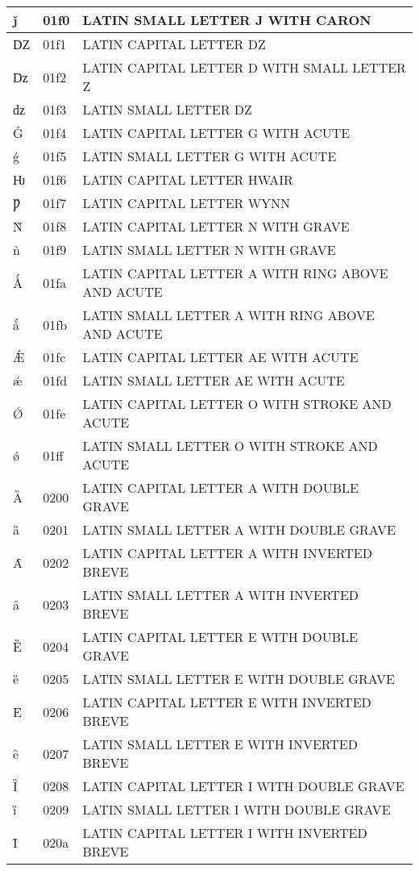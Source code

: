 \documentclass[12pt,letterpaper,openany]{book}
\begin{document}
\begin{center}
\begin{supertabular}{|m{0.25in}|m{0.5in}|m{4in}|}
			ǰ & 01f0 & LATIN SMALL LETTER J WITH CARON\\\hline
			Ǳ & 01f1 & LATIN CAPITAL LETTER DZ\\\hline
			ǲ & 01f2 & LATIN CAPITAL LETTER D WITH SMALL LETTER Z\\\hline
			ǳ & 01f3 & LATIN SMALL LETTER DZ\\\hline
			Ǵ & 01f4 & LATIN CAPITAL LETTER G WITH ACUTE\\\hline
			ǵ & 01f5 & LATIN SMALL LETTER G WITH ACUTE\\\hline
			Ƕ & 01f6 & LATIN CAPITAL LETTER HWAIR\\\hline
			Ƿ & 01f7 & LATIN CAPITAL LETTER WYNN\\\hline
			Ǹ & 01f8 & LATIN CAPITAL LETTER N WITH GRAVE\\\hline
			ǹ & 01f9 & LATIN SMALL LETTER N WITH GRAVE\\\hline
			Ǻ & 01fa & LATIN CAPITAL LETTER A WITH RING ABOVE AND ACUTE\\\hline
			ǻ & 01fb & LATIN SMALL LETTER A WITH RING ABOVE AND ACUTE\\\hline
			Ǽ & 01fc & LATIN CAPITAL LETTER AE WITH ACUTE\\\hline
			ǽ & 01fd & LATIN SMALL LETTER AE WITH ACUTE\\\hline
			Ǿ & 01fe & LATIN CAPITAL LETTER O WITH STROKE AND ACUTE\\\hline
			ǿ & 01ff & LATIN SMALL LETTER O WITH STROKE AND ACUTE\\\hline
			Ȁ & 0200 & LATIN CAPITAL LETTER A WITH DOUBLE GRAVE\\\hline
			ȁ & 0201 & LATIN SMALL LETTER A WITH DOUBLE GRAVE\\\hline
			Ȃ & 0202 & LATIN CAPITAL LETTER A WITH INVERTED BREVE\\\hline
			ȃ & 0203 & LATIN SMALL LETTER A WITH INVERTED BREVE\\\hline
			Ȅ & 0204 & LATIN CAPITAL LETTER E WITH DOUBLE GRAVE\\\hline
			ȅ & 0205 & LATIN SMALL LETTER E WITH DOUBLE GRAVE\\\hline
			Ȇ & 0206 & LATIN CAPITAL LETTER E WITH INVERTED BREVE\\\hline
			ȇ & 0207 & LATIN SMALL LETTER E WITH INVERTED BREVE\\\hline
			Ȉ & 0208 & LATIN CAPITAL LETTER I WITH DOUBLE GRAVE\\\hline
			ȉ & 0209 & LATIN SMALL LETTER I WITH DOUBLE GRAVE\\\hline
			Ȋ & 020a & LATIN CAPITAL LETTER I WITH INVERTED BREVE\\\hline

\end{supertabular}
\end{center}
\end{document}
